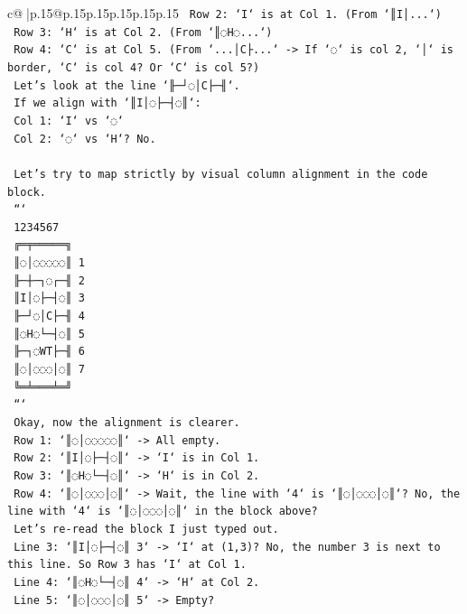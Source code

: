 \documentclass{article}
\begin{document}
{\begin{supertabular}{c@{$\;$}|p{.15\linewidth}@{}p{.15\linewidth}p{.15\linewidth}p{.15\linewidth}p{.15\linewidth}p{.15\linewidth}}
{{{\texttt{   Row 2: `I` is at Col 1. (From `║I│...`)} \\
\texttt{   Row 3: `H` is at Col 2. (From `║◌H◌...`)} \\
\texttt{   Row 4: `C` is at Col 5. (From `...│C├...` {-}> If `◌` is col 2, `│` is border, `C` is col 4? Or `C` is col 5?)} \\
\texttt{   Let's look at the line `╟─┘◌│C├─╢`.} \\
\texttt{   If we align with `║I│◌├─┤◌║`:} \\
\texttt{   Col 1: `I` vs `◌`} \\
\texttt{   Col 2: `◌` vs `H`? No.} \\
\\ 
\texttt{   Let's try to map strictly by visual column alignment in the code block.} \\
\texttt{   ```} \\
\texttt{    1234567} \\
\texttt{   ╔═╤═════╗} \\
\texttt{   ║◌│◌◌◌◌◌║ 1} \\
\texttt{   ╟─┼─┐◌┌─╢ 2} \\
\texttt{   ║I│◌├─┤◌║ 3} \\
\texttt{   ╟─┘◌│C├─╢ 4} \\
\texttt{   ║◌H◌└─┤◌║ 5} \\
\texttt{   ╟─┐◌WT├─╢ 6} \\
\texttt{   ║◌│◌◌◌│◌║ 7} \\
\texttt{   ╚═╧═══╧═╝} \\
\texttt{   ```} \\
\texttt{   Okay, now the alignment is clearer.} \\
\texttt{   Row 1: `║◌│◌◌◌◌◌║` {-}> All empty.} \\
\texttt{   Row 2: `║I│◌├─┤◌║` {-}> `I` is in Col 1.} \\
\texttt{   Row 3: `║◌H◌└─┤◌║` {-}> `H` is in Col 2.} \\
\texttt{   Row 4: `║◌│◌◌◌│◌║` {-}> Wait, the line with `4` is `║◌│◌◌◌│◌║`? No, the line with `4` is `║◌│◌◌◌│◌║` in the block above?} \\
\texttt{   Let's re{-}read the block I just typed out.} \\
\texttt{   Line 3: `║I│◌├─┤◌║ 3` {-}> `I` at (1,3)? No, the number 3 is next to this line. So Row 3 has `I` at Col 1.} \\
\texttt{   Line 4: `║◌H◌└─┤◌║ 4` {-}> `H` at Col 2.} \\
\texttt{   Line 5: `║◌│◌◌◌│◌║ 5` {-}> Empty?} \\
}}}
\end{supertabular}}
\end{document}
